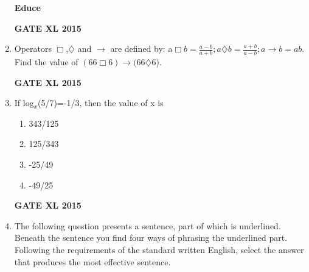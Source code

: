 \documentclass[journal,12pt,onecolumn]{IEEEtran}
\begin{document}
\begin{enumerate}
	\textbf{Educe}
    \begin{enumerate}
    \end{enumerate}
\begin{flushright}\textbf{GATE XL 2015}\end{flushright}
\item Operators $\Box$,$\diamondsuit$ and $\rightarrow$ are defined by: a$\Box b=\frac{a-b}{a+b};a \diamondsuit b = \frac{a+b}{a-b};a\rightarrow b = ab$. Find the value of $(66\Box6)\rightarrow(66\diamondsuit6$).
    \begin{enumerate}
    \end{enumerate}
\begin{flushright}\textbf{GATE XL 2015}\end{flushright}
\item If log$_x$(5/7)=-1/3, then the value of x is
    \begin{enumerate}
            \item 343/125
            \item 125/343
            \item -25/49
            \item -49/25
    \end{enumerate}
\begin{flushright}\textbf{GATE XL 2015}\end{flushright}
\item The following question presents a sentence, part of which is underlined. Beneath the sentence you find four ways of phrasing the underlined part. Following the requirements of the standard written English, select the answer that produces the most effective sentence.


\end{enumerate}
\end{document}
